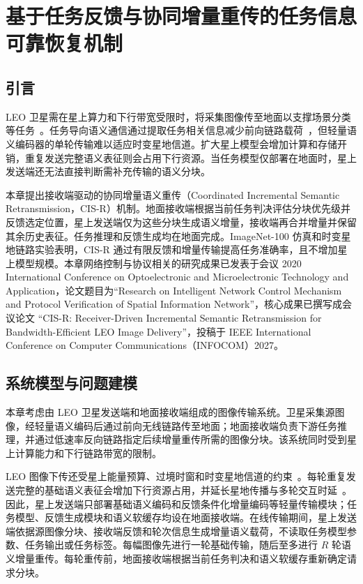 \chapter{基于任务反馈与协同增量重传的任务信息可靠恢复机制}
\label{chap:semantic}

\section{引言}

LEO 卫星需在星上算力和下行带宽受限时，将采集图像传至地面以支撑场景分类等任务~\cite{xiao-SAGINSurvey-JSAC2024}。任务导向语义通信通过提取任务相关信息减少前向链路载荷~\cite{Shao-TaskOrientedCommunication-JSAC2022,peng-RobustImageSemanticCommunication-JSAC2025,Park-TransmitWhatYouNeed-JSAC2025}，但轻量语义编码器的单轮传输难以适应时变星地信道。扩大星上模型会增加计算和存储开销，重复发送完整语义表征则会占用下行资源。当任务模型仅部署在地面时，星上发送端还无法直接判断需补充传输的语义分块。

本章提出接收端驱动的协同增量语义重传（Coordinated Incremental Semantic Retransmission，CIS-R）机制。地面接收端根据当前任务判决评估分块优先级并反馈选定位置，星上发送端仅为这些分块生成语义增量，接收端再合并增量并保留其余历史表征。任务推理和反馈生成均在地面完成。ImageNet-100 仿真和时变星地链路实验表明，CIS-R 通过有限反馈和增量传输提高任务准确率，且不增加星上模型规模。本章网络控制与协议相关的研究成果已发表于会议 2020 International Conference on Optoelectronic and Microelectronic Technology and Application，论文题目为``Research on Intelligent Network Control Mechanism and Protocol Verification of Spatial Information Network''\cite{lxp-networkControl}，核心成果已撰写成会议论文 ``CIS-R: Receiver-Driven Incremental Semantic Retransmission for Bandwidth-Efficient LEO Image Delivery''，投稿于 IEEE International Conference on Computer Communications（INFOCOM）2027。

\section{系统模型与问题建模}
\label{sec:ch6_sysmodel}

本章考虑由 LEO 卫星发送端和地面接收端组成的图像传输系统。卫星采集源图像，经轻量语义编码后通过前向无线链路传至地面；地面接收端负责下游任务推理，并通过低速率反向链路指定后续增量重传所需的图像分块。该系统同时受到星上计算能力和下行链路带宽的限制。

LEO 图像下传还受星上能量预算、过境时窗和时变星地信道的约束~\cite{zhang2024resource,chen2023energy}。每轮重复发送完整的基础语义表征会增加下行资源占用，并延长星地传播与多轮交互时延~\cite{martinez2022edge}。因此，星上发送端只部署基础语义编码和反馈条件化增量编码等轻量传输模块；任务模型、反馈生成模块和语义软缓存均设在地面接收端。在线传输期间，星上发送端依据源图像分块、接收端反馈和轮次信息生成增量语义载荷，不读取任务模型参数、任务输出或任务标签。每幅图像先进行一轮基础传输，随后至多进行 $R$ 轮语义增量重传。每轮重传前，地面接收端根据当前任务判决和语义软缓存重新确定请求分块。

